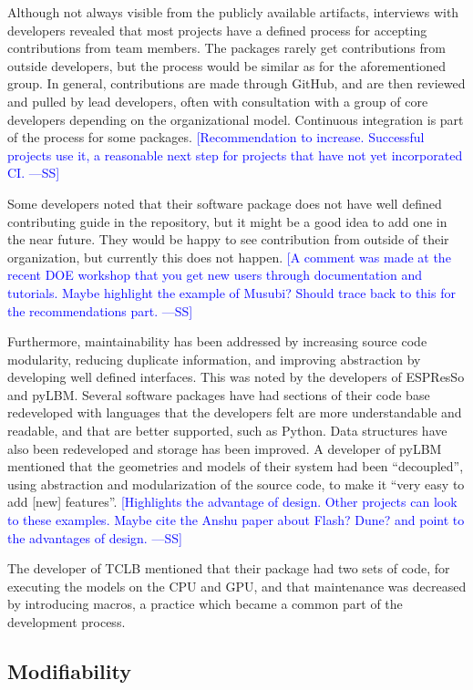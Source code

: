 \documentclass[final, 3p, times, authoryear]{elsarticle}
\newcommand{\authornote}[3]{\textcolor{#1}{[#3 ---#2]}}
\newcommand{\authornote}[3]{}
\newcommand{\wss}[1]{\authornote{blue}{SS}{#1}} %
\begin{document}
Although not always visible from the publicly available artifacts, interviews
with developers revealed that most projects have a defined process for accepting
contributions from team members. The packages rarely get contributions from
outside developers, but the process would be similar as for the aforementioned
group.  In general, contributions are made through GitHub, and are then reviewed
and pulled by lead developers, often with consultation with a group of core
developers depending on the organizational model. Continuous integration is part
of the process for some packages. \wss{Recommendation to increase.  Successful
projects use it, a reasonable next step for projects that have not yet
incorporated CI.}

Some developers noted that their software package does not have well defined
contributing guide in the repository, but it might be a good idea to add one in
the near future. They would be happy to see contribution from outside of their
organization, but currently this does not happen.  \wss{A comment was made at
the recent DOE workshop that you get new users through documentation and
tutorials.  Maybe highlight the example of Musubi?  Should trace back to this
for the recommendations part.}

Furthermore, maintainability has been addressed by increasing source code
modularity, reducing duplicate information, and improving abstraction by
developing well defined interfaces. This was noted by the developers of ESPResSo
and pyLBM. Several software packages have had sections of their code base
redeveloped with languages that the developers felt are more understandable and
readable, and that are better supported, such as Python. Data structures have
also been redeveloped and storage has been improved. A developer of pyLBM
mentioned that the geometries and models of their system had been ``decoupled'',
using abstraction and modularization of the source code, to make it ``very easy
to add [new] features''.  \wss{Highlights the advantage of design.  Other
projects can look to these examples.  Maybe cite the Anshu paper about Flash?
Dune?  and point to the advantages of design.}

The developer of TCLB mentioned that their package had two sets of code, for
executing the models on the CPU and GPU, and that maintenance was decreased by
introducing macros, a practice which became a common part of the development
process. 

\subsection{Modifiability}
\end{document}
